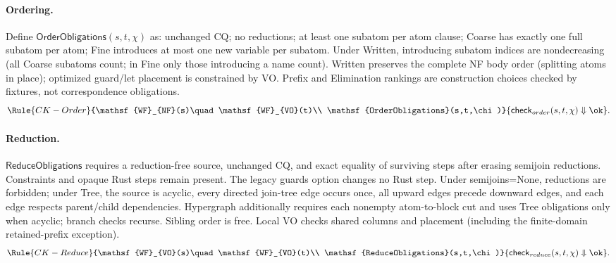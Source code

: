 \paragraph{Ordering.}
Define $\mathsf{OrderObligations}(s,t,\chi)$ as: unchanged CQ; no reductions;
at least one subatom per atom clause; Coarse has
exactly one full subatom per atom; Fine introduces at most one new variable per
subatom. Under Written, introducing subatom indices are nondecreasing (all
Coarse subatoms count; in Fine only those introducing a name count).
Written preserves the complete NF body order (splitting atoms in place);
optimized guard/let placement is constrained by VO.
Prefix and Elimination rankings are construction choices checked by fixtures,
not correspondence obligations.
\[
\Rule{CK-Order}{\mathsf{WF}_{NF}(s)\quad\mathsf{WF}_{VO}(t)\\
 \mathsf{OrderObligations}(s,t,\chi)}
 {\mathsf{check}_{order}(s,t,\chi)\Downarrow\ok}.
\]

\paragraph{Reduction.}
$\mathsf{ReduceObligations}$ requires a reduction-free source, unchanged CQ,
and exact equality of surviving steps after erasing semijoin reductions.
Constraints and opaque Rust steps remain present. The legacy guards option
changes no Rust step. Under semijoins=None, reductions are forbidden; under
Tree, the source is acyclic, every directed join-tree edge occurs once, all
upward edges precede downward edges, and each edge respects parent/child
dependencies. Hypergraph additionally requires each nonempty atom-to-block
cut and uses Tree obligations only when acyclic; branch checks recurse. Sibling order is free. Local VO checks shared columns and
placement (including the finite-domain retained-prefix exception).
\[
\Rule{CK-Reduce}{\mathsf{WF}_{VO}(s)\quad\mathsf{WF}_{VO}(t)\\
 \mathsf{ReduceObligations}(s,t,\chi)}
 {\mathsf{check}_{reduce}(s,t,\chi)\Downarrow\ok}.
\]

